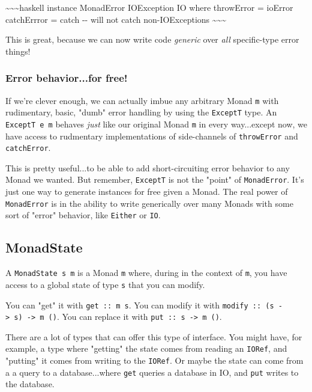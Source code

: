 \documentclass[]{article}
\begin{document}
\textasciitilde{}\textasciitilde{}\textasciitilde{}haskell instance MonadError
IOException IO where throwError = ioError catchErrror = catch -\/- will not
catch non-IOExceptions \textasciitilde{}\textasciitilde{}\textasciitilde{}

This is great, because we can now write code \emph{generic} over \emph{all}
specific-type error things!

\subsubsection{Error behavior...for free!}

If we're clever enough, we can actually imbue any arbitrary Monad \texttt{m}
with rudimentary, basic, "dumb" error handling by using the \texttt{ExceptT}
type. An \texttt{ExceptT\ e\ m} behaves \emph{just} like our original Monad
\texttt{m} in every way...except now, we have access to rudmentary
implementations of side-channels of \texttt{throwError} and \texttt{catchError}.

This is pretty useful...to be able to add short-circuiting error behavior to any
Monad we wanted. But remember, \texttt{ExceptT} is not the "point" of
\texttt{MonadError}. It's just one way to generate instances for free given a
Monad. The real power of \texttt{MonadError} is in the ability to write
generically over many Monads with some sort of "error" behavior, like
\texttt{Either} or \texttt{IO}.

\subsection{MonadState}

A \texttt{MonadState\ s\ m} is a Monad \texttt{m} where, during in the context
of \texttt{m}, you have access to a global state of type \texttt{s} that you can
modify.

You can "get" it with \texttt{get\ ::\ m\ s}. You can modify it with
\texttt{modify\ ::\ (s\ -\textgreater{}\ s)\ -\textgreater{}\ m\ ()}. You can
replace it with \texttt{put\ ::\ s\ -\textgreater{}\ m\ ()}.

There are a lot of types that can offer this type of interface. You might have,
for example, a type where "getting" the state comes from reading an
\texttt{IORef}, and "putting" it comes from writing to the \texttt{IORef}. Or
maybe the state can come from a a query to a database...where \texttt{get}
queries a database in IO, and \texttt{put} writes to the database.
\end{document}

